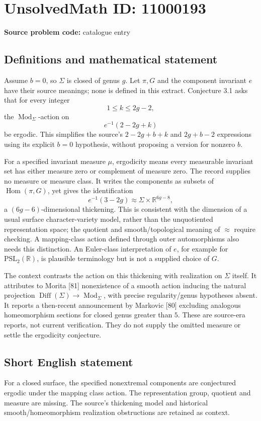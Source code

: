 \documentclass[11pt]{article}
\newcommand{\R}{\mathbb{R}}
\begin{document}
\section*{UnsolvedMath ID: 11000193}
\textbf{Source problem code:} catalogue entry
\subsection{Definitions and mathematical statement}
Assume \(b=0\), so \(\Sigma\) is closed of genus \(g\). Let \(\pi,G\) and the component invariant \(e\) have their source meanings; none is defined in this extract. Conjecture 3.1 asks that for every integer
\[
 1\le k\le2g-2,
\]
the \(\operatorname{Mod}_\Sigma\)-action on
\[
 e^{-1}(2-2g+k)
\]
be ergodic. This simplifies the source's \(2-2g+b+k\) and \(2g+b-2\) expressions using its explicit \(b=0\) hypothesis, without proposing a version for nonzero \(b\).

For a specified invariant measure \(\mu\), ergodicity means every measurable invariant set has either measure zero or complement of measure zero. The record supplies no measure or measure class. It writes the components as subsets of \(\operatorname{Hom}(\pi,G)\), yet gives the identification
\[
 e^{-1}(3-2g)\approx\Sigma\times\R^{6g-8},
\]
a \((6g-6)\)-dimensional thickening. This is consistent with the dimension of a usual surface character-variety model, rather than the unquotiented representation space; the quotient and smooth/topological meaning of \(\approx\) require checking. A mapping-class action defined through outer automorphisms also needs this distinction. An Euler-class interpretation of \(e\), for example for \(\mathrm{PSL}_2(\R)\), is plausible terminology but is not a supplied choice of \(G\).

The context contrasts the action on this thickening with realization on \(\Sigma\) itself. It attributes to Morita [81] nonexistence of a smooth action inducing the natural projection \(\operatorname{Diff}(\Sigma)\to\operatorname{Mod}_\Sigma\), with precise regularity/genus hypotheses absent. It reports a then-recent announcement by Markovic [80] excluding analogous homeomorphism sections for closed genus greater than \(5\). These are source-era reports, not current verification. They do not supply the omitted measure or settle the ergodicity conjecture.
\subsection{Short English statement}
For a closed surface, the specified nonextremal components are conjectured ergodic under the mapping class action. The representation group, quotient and measure are missing. The source's thickening model and historical smooth/homeomorphism realization obstructions are retained as context.
\end{document}
